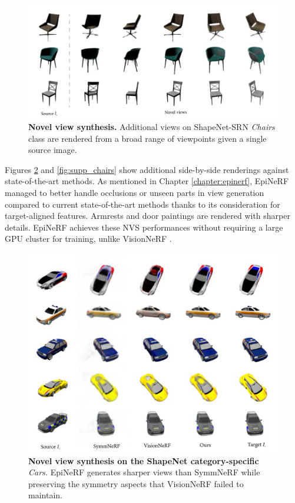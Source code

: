 \begin{figure}[htp!]
    \begin{center}
  \includegraphics[width=\linewidth]{images/epinerf/supp_NVS_Chairs.png}
  \caption{\textbf{Novel view synthesis.} Additional views on ShapeNet-SRN \textit{Chairs} class are rendered from a broad range of viewpoints given a single source image. }
  \label{fig:supp_NVSchairs}
  \end{center}
\end{figure}

Figures \ref{fig:supp_cars} and \ref{fig:supp_chairs} show additional side-by-side renderings against state-of-the-art methods. As mentioned in Chapter \ref{chapter:epinerf}, EpiNeRF managed to better handle occlusions or unseen parts in view generation compared to current state-of-the-art methods thanks to its consideration for target-aligned features. Armrests and door paintings are rendered with sharper details. EpiNeRF achieves these \ac{NVS} performances without requiring a large \ac{GPU} cluster for training, unlike VisionNeRF \citep{lin2023vision}.

\begin{figure}[htp!]
    \begin{center}
  \includegraphics[width=\linewidth]{images/epinerf/supp_Cars_additional_inference.png}
  \caption{\textbf{Novel view synthesis on the ShapeNet category-specific} \textit{Cars. }EpiNeRF generates sharper views than SymmNeRF while preserving the symmetry aspects that VisionNeRF failed to maintain.}
  \label{fig:supp_cars}
  \end{center}
\end{figure}


